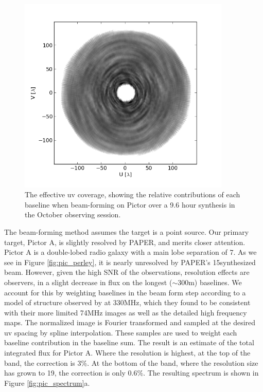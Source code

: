 \documentclass[preprint]{aastex}
\begin{document}
\begin{figure}
\includegraphics[width=0.9\textwidth]{plots/PicA_Oct2011_uv_coverage.png}
\caption{The effective uv coverage, showing the relative contributions of each baseline when beam-forming on Pictor over a 9.6 hour synthesis in the October observing session. \label{fig:uv_coverage}}
\end{figure}

The beam-forming method assumes the target is a point source. Our primary
target, Pictor A, is slightly resolved by PAPER, and merits closer attention.
Pictor A is a double-lobed radio galaxy with a main lobe separation of
7\arcmin. As we see in Figure \ref{fig:pic_perley}, it is nearly unresolved by
PAPER's 15\arcmin synthesized beam. However, given the high SNR of the
observations, resolution effects are observers, in a slight decrease in flux on
the longest ($\sim$300m) baselines. We account for this by weighting baselines
in the beam form step according to a model of structure observed by
\citet{Perley:1997p9312} at 330MHz, which they found to be consistent with
their more limited 74MHz images as well as the detailed high frequency maps.
The normalized image is Fourier transformed and sampled at the desired uv
spacing by spline interpolation. These samples are used to weight each baseline
contribution in the baseline sum. The result is an estimate of the total
integrated flux for Pictor A. Where the resolution is highest, at the top of
the band, the correction is 3\%. At the bottom of the band, where the
resolution size has grown to 19\arcmin, the correction is only 0.6\%. The
resulting spectrum is shown in Figure \ref{fig:pic_spectrum}a.
\end{document}
